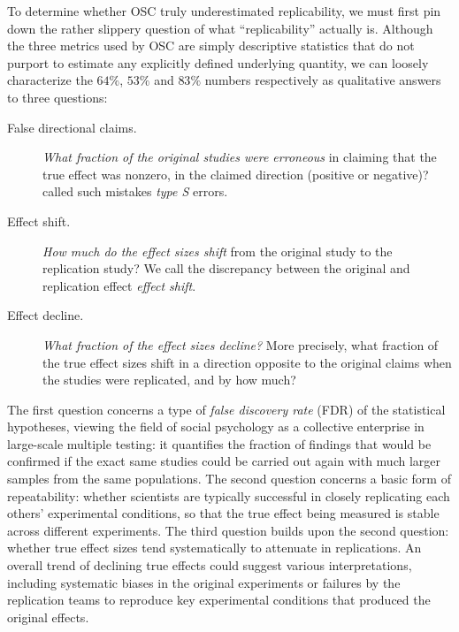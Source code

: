\documentclass[aoas, preprint]{imsart}
\theoremstyle{definition}
\theoremstyle{custom}
\begin{document}
  To determine whether OSC truly underestimated replicability, we must first pin down the rather slippery question of what ``replicability'' actually is. Although the three metrics used by OSC are simply descriptive statistics that do not purport to estimate any explicitly defined underlying quantity, we can loosely characterize the $64\%$, $53\%$ and $83\%$ numbers respectively as qualitative answers to three questions:
  \begin{description}
    \item[False directional claims.] {\em What fraction of the original studies were erroneous} in claiming that the true effect was nonzero, in the claimed direction (positive or negative)? \citet{Gelman:2000tg} called such mistakes {\em type S} errors.
    \item[Effect shift.] {\em How much do the effect sizes shift} from the original study to the replication study? We call the discrepancy between the original and replication effect {\em effect shift}.
    \item[Effect decline.] {\em What fraction of the effect sizes decline?} More precisely, what fraction of the true effect sizes shift in a direction opposite to the original claims when the studies were replicated, and by how much?
  \end{description}
  The first question concerns a type of {\em false discovery rate} (FDR) of the statistical hypotheses, viewing the field of social psychology as a collective enterprise in large-scale multiple testing: it quantifies the fraction of findings that would be confirmed if the exact same studies could be carried out again with much larger samples from the same populations. The second question concerns a basic form of repeatability: whether scientists are typically successful in closely replicating each others' experimental conditions, so that the true effect being measured is stable across different experiments. The third question builds upon the second question: whether true effect sizes tend systematically to attenuate in replications. An overall trend of declining true effects could suggest various interpretations, including systematic biases in the original experiments or failures by the replication teams to reproduce key experimental conditions that produced the original effects.
\end{document}
